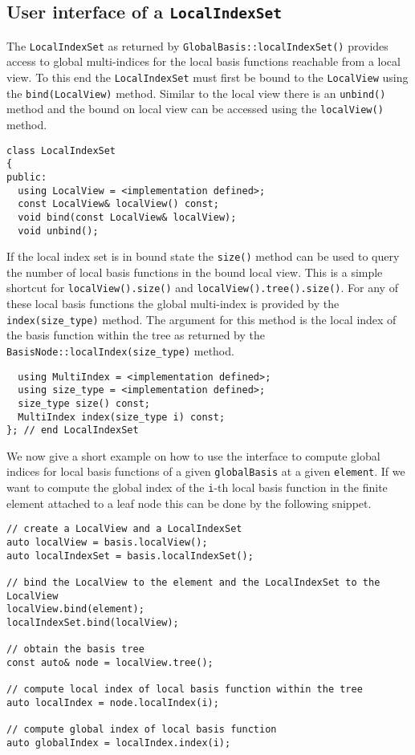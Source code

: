 \documentclass[a4paper,10pt,headings=normal,bibliography=totoc]{scrartcl}
\begin{document}
\subsection{User interface of a \texttt{LocalIndexSet}}
The \texttt{LocalIndexSet} as returned by \texttt{GlobalBasis::localIndexSet()}
provides access to global multi-indices for the
local basis functions reachable from a local view.
To this end the \texttt{LocalIndexSet} must
first be bound to the \texttt{LocalView} using
the \texttt{bind(LocalView)} method. Similar to the
local view there is an \texttt{unbind()} method
and the bound on local view can be accessed
using the \texttt{localView()} method.

\begin{lstlisting}
class LocalIndexSet
{
public:
  using LocalView = <implementation defined>;
  const LocalView& localView() const;
  void bind(const LocalView& localView);
  void unbind();
\end{lstlisting}

If the local index set is in bound state
the \texttt{size()} method can be used to query
the number of local basis functions in the
bound local view. This is a simple shortcut for
\texttt{localView().size()} and \texttt{localView().tree().size()}.
For any of these local basis functions the global
multi-index is provided by the \texttt{index(size\_type)}
method. The argument for this method is the local
index of the basis function within the tree as
returned by the \texttt{BasisNode::localIndex(size\_type)}
method.

\begin{lstlisting}
  using MultiIndex = <implementation defined>;
  using size_type = <implementation defined>;
  size_type size() const;
  MultiIndex index(size_type i) const;
}; // end LocalIndexSet
\end{lstlisting}

We now give a short example on how to use the interface
to compute global indices for local basis functions
of a given \texttt{globalBasis} at a given \texttt{element}.
If we want to compute the global index of the \texttt{i}-th
local basis function in the finite element attached to
a leaf node this can be done by the following snippet.

\begin{lstlisting}
// create a LocalView and a LocalIndexSet
auto localView = basis.localView();
auto localIndexSet = basis.localIndexSet();

// bind the LocalView to the element and the LocalIndexSet to the LocalView
localView.bind(element);
localIndexSet.bind(localView);

// obtain the basis tree
const auto& node = localView.tree();

// compute local index of local basis function within the tree
auto localIndex = node.localIndex(i);

// compute global index of local basis function
auto globalIndex = localIndex.index(i);
\end{lstlisting}
\end{document}
